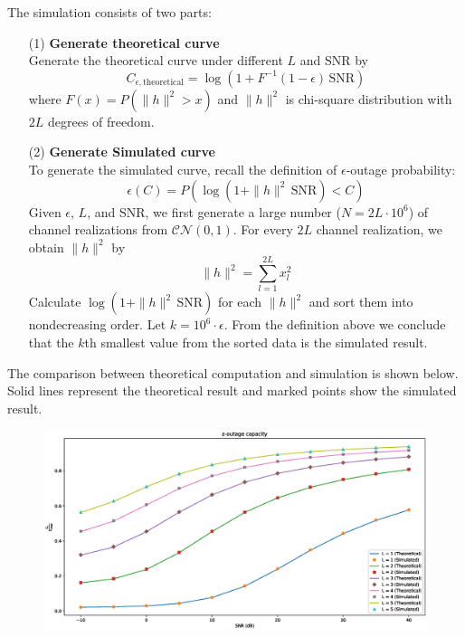 The simulation consists of two parts:
\vspace{-5pt}
\begin{itemize}
	\item[(1)] \textbf{Generate theoretical curve \hfill \\}
	Generate the theoretical curve under different $L$ and SNR by
	\begin{equation*}
		C_{\epsilon, \text{theoretical}} = \log\left(1 + F^{-1}(1-\epsilon) \, \text{SNR}\right)
	\end{equation*}
	where $F(x) = P\left(\|h\|^{2} > x\right)$ and $\|h\|^{2}$ is chi-square distribution with $2L$ degrees of freedom.
	\item[(2)] \textbf{Generate Simulated curve \hfill \\}
	To generate the simulated curve, recall the definition of $\epsilon$-outage probability:
	\begin{equation*}
		\epsilon\left(C\right) = P\left(\log(1 + \|h\|^{2} \, \text{SNR}) < C\right)
	\end{equation*} 
	Given $\epsilon$, $L$, and SNR, we first generate a large number ($N = 2L \cdot 10^6$) of channel 
	realizations from $\mathcal{CN}(0,1)$. For every $2L$ channel realization, we obtain $\|h\|^2$ by
	\begin{equation*}
		\|h\|^2 = \sum_{l=1}^{2L} x_l^2
	\end{equation*}
	Calculate $\log(1 + \|h\|^{2} \, \text{SNR})$ for each $\|h\|^2$ and sort them into nondecreasing 
	order. Let $k = 10^6 \cdot \epsilon$. From the definition above we conclude that the $k$th smallest value from the sorted data
	is the simulated result.

\end{itemize}

The comparison between theoretical computation and simulation is shown below. Solid lines 
represent the theoretical result and marked points show the simulated result. 
\begin{figure}[H]
	\centering
	\includegraphics[scale = 0.5]{epsilon_outage.eps}
\end{figure}